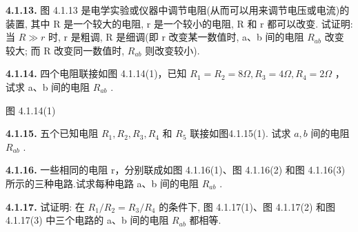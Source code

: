 \vfill
\newpage

\textbf{4.1.13.} 图 4.1.13 是电学实验或仪器中调节电阻(从而可以用来调节电压或电流)的装置, 其中 R 是一个较大的电阻, r 是一个较小的电阻, R 和 r 都可以改变. 试证明: 当 $R \gg r$ 时, r 是粗调, R 是细调(即 r 改变某一数值时, a、b 间的电阻 $R_{ab}$ 改变较大; 而 R 改变同一数值时, $R_{ab}$ 则改变较小).

\begin{center}
\end{center}

\vfill
\newpage

\textbf{4.1.14.} 四个电阻联接如图 4.1.14(1)，已知 $R_{1}=R_{2}=8\Omega, R_{3}=4\Omega, R_{4}=2\Omega$ ，试求 a、b 间的电阻 $R_{ab}$ .

图 4.1.14(1)

\begin{center}
\end{center}

\vfill
\newpage

\textbf{4.1.15.} 五个已知电阻 $R_{1}, R_{2}, R_{3}, R_{4}$ 和 $R_{5}$ 联接如图4.1.15(1). 试求 $a, b$ 间的电阻 $R_{ab}$ .

\begin{center}
\end{center}

\vfill
\newpage

\textbf{4.1.16.} 一些相同的电阻 r，分别联成如图 4.1.16(1)、图 4.1.16(2) 和图 4.1.16(3) 所示的三种电路.试求每种电路 a、b 间的电阻 $R_{ab}$ .

\begin{center}
\end{center}

\begin{center}
\end{center}

\begin{center}
\end{center}

\vfill
\newpage

\textbf{4.1.17.} 试证明: 在 $R_{1}/R_{2}=R_{3}/R_{4}$ 的条件下, 图 4.1.17(1)、图 4.1.17(2) 和图 4.1.17(3) 中三个电路的 a、b 间的电阻 $R_{ab}$ 都相等.

